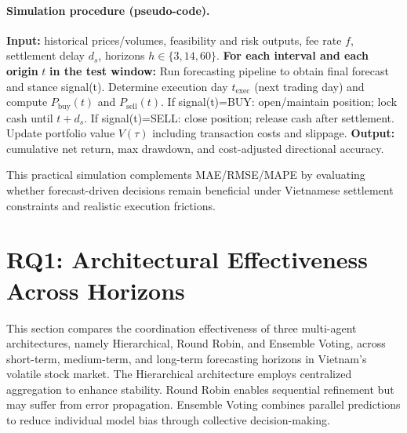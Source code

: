\documentclass{ieeeaccess}
\begin{document}
\paragraph{Simulation procedure (pseudo-code).}
\begin{algorithmic}[1]
\STATE \textbf{Input:} historical prices/volumes, feasibility and risk outputs, fee rate $f$, settlement delay $d_s$, horizons $h\in\{3,14,60\}$.
\STATE \textbf{For each interval and each origin } $t$ \textbf{in the test window:}
\STATE \hspace{0.8em}Run forecasting pipeline to obtain final forecast and stance signal(t).
\STATE \hspace{0.8em}Determine execution day $t_{\text{exec}}$ (next trading day) and compute $P_{\text{buy}}(t)$ and $P_{\text{sell}}(t)$.
\STATE \hspace{0.8em}If signal(t)=BUY: open/maintain position; lock cash until $t+d_s$.
\STATE \hspace{0.8em}If signal(t)=SELL: close position; release cash after settlement.
\STATE \hspace{0.8em}Update portfolio value $V(\tau)$ including transaction costs and slippage.
\STATE \textbf{Output:} cumulative net return, max drawdown, and cost-adjusted directional accuracy.
\end{algorithmic}

\noindent This practical simulation complements MAE/RMSE/MAPE by evaluating whether forecast-driven decisions remain beneficial under Vietnamese settlement constraints and realistic execution frictions.

\section{RQ1: Architectural Effectiveness Across Horizons}
This section compares the coordination effectiveness of three multi-agent architectures, namely Hierarchical, Round Robin, and Ensemble Voting, across short-term, medium-term, and long-term forecasting horizons in Vietnam’s volatile stock market. The Hierarchical architecture employs centralized aggregation to enhance stability. Round Robin enables sequential refinement but may suffer from error propagation. Ensemble Voting combines parallel predictions to reduce individual model bias through collective decision-making.
\clearpage
\onecolumn
\end{document}
